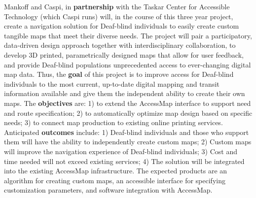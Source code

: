 Mankoff and Caspi, in \textbf{partnership} with the Taskar Center for Accessible Technology  (which Caspi runs)  will, in the course of this three year project, create a navigation solution for Deaf-blind individuals to easily create custom tangible maps that meet their diverse needs. 
 The project will pair a participatory, data-driven design approach together with interdisciplinary collaboration, to develop 3D printed, parametrically designed maps that allow for user feedback, and provide Deaf-blind populations unprecedented access to ever-changing digital map data. Thus, the \textbf{goal} of this project is to improve access for Deaf-blind individuals to the most current, up-to-date digital mapping and transit information available
and give them the independent ability to create their own maps.  The \textbf{objectives} are: 1) to extend the AccessMap interface to support need and route specification; 2) to automatically optimize map design based on specific needs; 3) to connect map production to existing online printing services. Anticipated \textbf{outcomes} include: 1) Deaf-blind individuals and those who support them will have the ability to independently create custom maps; 2) Custom maps will improve the navigation experience of Deaf-blind individuals; 3) Cost and time needed will not exceed existing services; 4) The solution will be integrated into the existing AccessMap infrastructure. The expected products are an algorithm for creating custom maps, an accessible interface for specifying customization parameters, and software integration with AccessMap. 
